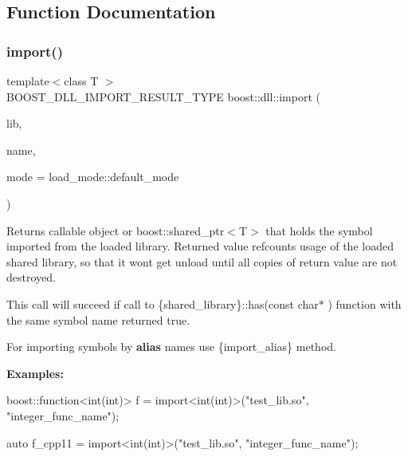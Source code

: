 \subsection{Function Documentation}
\mbox{\label{a00254_file_ade82cd3690b6f9f21ce1f92563c04694}} 
\subsubsection{\texorpdfstring{import()}{import()}\hspace{0.1cm}{\footnotesize\ttfamily [1/6]}}
{\footnotesize\ttfamily template$<$class T $>$ \\
B\+O\+O\+S\+T\+\_\+\+D\+L\+L\+\_\+\+I\+M\+P\+O\+R\+T\+\_\+\+R\+E\+S\+U\+L\+T\+\_\+\+T\+Y\+PE boost\+::dll\+::import (\begin{DoxyParamCaption}\item[{const boost\+::filesystem\+::path \&}]{lib,  }\item[{const char $\ast$}]{name,  }\item[{\hyperlink{a00272_a1918a602801479bc0bade54ff5665129}{load\+\_\+mode\+::type}}]{mode = {\ttfamily load\+\_\+mode\+:\+:default\+\_\+mode} }\end{DoxyParamCaption})}

Returns callable object or boost\+::shared\+\_\+ptr$<$\+T$>$ that holds the symbol imported from the loaded library. Returned value refcounts usage of the loaded shared library, so that it won\textquotesingle{}t get unload until all copies of return value are not destroyed.

This call will succeed if call to \{shared\+\_\+library\}{\ttfamily \+::has(const char$\ast$ )} function with the same symbol name returned {\ttfamily true}.

For importing symbols by {\bfseries alias} names use \{import\+\_\+alias\} method.

{\bfseries Examples\+:} 


\begin{DoxyCode}
boost::function<int(int)> f = import<int(int)>(\textcolor{stringliteral}{"test\_lib.so"}, \textcolor{stringliteral}{"integer\_func\_name"});

\textcolor{keyword}{auto} f\_cpp11 = import<int(int)>(\textcolor{stringliteral}{"test\_lib.so"}, \textcolor{stringliteral}{"integer\_func\_name"});
\end{DoxyCode}



